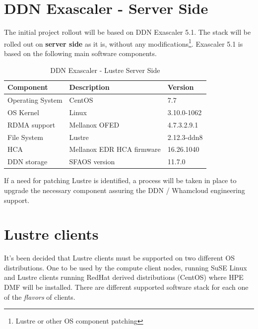 \documentclass{article}
\begin{document}
\section{DDN Exascaler - Server Side}
The initial project rollout will be based on DDN Exascaler 5.1. The stack will be rolled out on \textbf{server side}  as it is, without any modifications\footnote{Lustre or other OS component patching}. Exascaler 5.1 is based on the following main software components. 
\begin{table}[h]
 \centering
 \begin{tabular}{||l l l||}
 \hline
 \textbf{Component} & \textbf{Description} & \textbf{Version} \\ [0.5ex] 
 \hline\hline
 Operating System & CentOS & 7.7 \\ 
 \hline
 OS Kernel & Linux & 3.10.0-1062 \\
 \hline
 RDMA support & Mellanox OFED & 4.7.3.2.9.1 \\
 \hline
 File System & Lustre & 2.12.3-ddn8 \\
 \hline
 HCA & Mellanox EDR HCA firmware & 16.26.1040 \\
 \hline
 DDN storage & SFAOS version & 11.7.0 \\
 \hline
 \end{tabular}
 \caption{DDN Exascaler - Lustre Server Side}
 \label{tab:os-compat-serverside}
\end{table}

If a need for patching Lustre is identified, a process will be taken in place to upgrade the necessary component assuring the DDN / Whamcloud engineering support.

\section{Lustre clients}
It's been decided that Lustre clients must be supported on two different OS distributions. One to be used by the compute client nodes, running SuSE Linux and Lustre clients running RedHat derived distributions (CentOS) where HPE DMF will be installed. There are different supported software stack for each one of the \textit{flavors} of clients.
\end{document}
